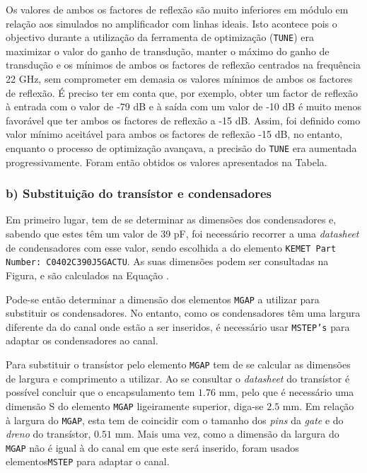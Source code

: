 \documentclass[11pt]{article}
\numberwithin{equation}{section}
\begin{document}
Os valores de ambos os factores de reflexão são muito inferiores em módulo em relação aos simulados no amplificador com linhas ideais. Isto acontece pois o objectivo durante a utilização da ferramenta de optimização (\texttt{TUNE}) era maximizar o valor do ganho de transdução, manter o máximo do ganho de transdução e os mínimos de ambos os factores de reflexão centrados na frequência 22 GHz, sem comprometer em demasia os valores mínimos de ambos os factores de reflexão. É preciso ter em conta que, por exemplo, obter um factor de reflexão à entrada com o valor de -79 dB e à saída com um valor de -10 dB é muito menos favorável que ter ambos os factores de reflexão a -15 dB. Assim, foi definido como valor mínimo aceitável para ambos os factores de reflexão -15 dB, no entanto, enquanto o processo de optimização avançava, a precisão do \texttt{TUNE} era aumentada progressivamente. Foram então obtidos os valores apresentados na Tabela.

\subsubsection{b) Substituição do transístor e condensadores}

Em primeiro lugar, tem de se determinar as dimensões dos condensadores e, sabendo que estes têm um valor de 39 pF, foi necessário recorrer a uma \textit{datasheet} de condensadores com esse valor, sendo escolhida a do elemento \texttt{KEMET Part Number: C0402C390J5GACTU}. As suas dimensões podem ser consultadas na Figura, e são calculados na Equação .


\vspace{-1mm}
Pode-se então determinar a dimensão dos elementos \texttt{MGAP} a utilizar para substituir os condensadores. No entanto, como os condensadores têm uma largura diferente da do canal onde estão a ser inseridos, é necessário usar \texttt{MSTEP's} para adaptar os condensadores ao canal.

Para substituir o transístor pelo elemento \texttt{MGAP} tem de se calcular as dimensões de largura e comprimento a utilizar. Ao se consultar o \textit{datasheet} do transístor é possível concluir que o encapsulamento tem $1.76$ mm, pelo que é necessário uma dimensão S do elemento \texttt{MGAP} ligeiramente superior, diga-se $2.5$ mm. Em relação à largura do \texttt{MGAP}, esta tem de coincidir com o tamanho dos \textit{pins} da \textit{gate} e do \textit{dreno} do transístor, $0.51$ mm. Mais uma vez, como a dimensão da largura do \texttt{MGAP} não é igual à do canal em que este será inserido, foram usados elementos\texttt{MSTEP} para adaptar o canal.
\end{document}
